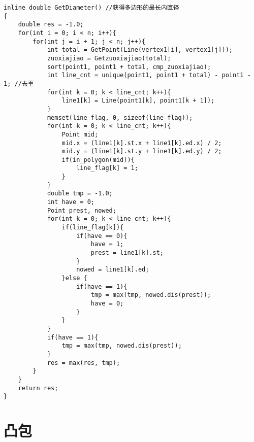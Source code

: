\begin{lstlisting}
inline double GetDiameter() //获得多边形的最长内直径
{
    double res = -1.0;
    for(int i = 0; i < n; i++){
        for(int j = i + 1; j < n; j++){
            int total = GetPoint(Line(vertex1[i], vertex1[j]));
            zuoxiajiao = Getzuoxiajiao(total);
            sort(point1, point1 + total, cmp_zuoxiajiao);
            int line_cnt = unique(point1, point1 + total) - point1 - 1; //去重
            for(int k = 0; k < line_cnt; k++){
                line1[k] = Line(point1[k], point1[k + 1]);
            }
            memset(line_flag, 0, sizeof(line_flag));
            for(int k = 0; k < line_cnt; k++){
                Point mid;
                mid.x = (line1[k].st.x + line1[k].ed.x) / 2;
                mid.y = (line1[k].st.y + line1[k].ed.y) / 2;
                if(in_polygon(mid)){
                    line_flag[k] = 1;
                }
            }
            double tmp = -1.0;
            int have = 0;
            Point prest, nowed;
            for(int k = 0; k < line_cnt; k++){
                if(line_flag[k]){
                    if(have == 0){
                        have = 1;
                        prest = line1[k].st;
                    }
                    nowed = line1[k].ed;
                }else {
                    if(have == 1){
                        tmp = max(tmp, nowed.dis(prest));
                        have = 0;
                    }
                }
            }
            if(have == 1){
                tmp = max(tmp, nowed.dis(prest));
            }
            res = max(res, tmp);
        }
    }
    return res;
}
\end{lstlisting}

\clearpage
\section{凸包}

